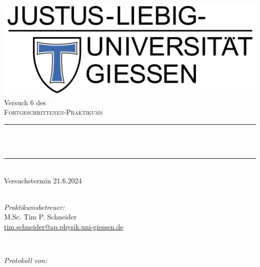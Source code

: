 \documentclass[12pt,a4paper,ngerman]{report}
\title{\versuchstitel}
\author{Frederik Uhlemann, Florian Adamczyk}
\date{\today}
\makeatletter
\let\thetitle\@title
\makeatother
\begin{document}
		
	
	\begin{titlepage}
		\centering
		\vspace*{0.5 cm}
		\includegraphics[width = 0.6 \textwidth]{JLU_Giessen-Logo}	%
		\\[2.0 cm]
		Versuch 6 des\\
		\textsc{\Large Fortgeschrittenen-Praktikums}\\ [0.3 cm]				%
		\rule{\linewidth}{0.2 mm} \\[0.4 cm]
		{ \huge \bfseries \thetitle}\\%
		\rule{\linewidth}{0.2 mm}\\
		Versuchstermin 21.6.2024 \\
		~ \\
		[2.0 cm]
		
		
		\begin{minipage}{0.49\textwidth}
			\begin{flushleft}
				 \emph{Praktikumsbetreuer:}\\
				 M.Sc. Tim P. Schneider\\
				 \small{\href{mailto:tim.schneider@ap.physik.uni-giessen.de}{tim.schneider@ap.physik.uni-giessen.de}}
			\end{flushleft}
		\end{minipage}~
		\begin{minipage}{0.49\textwidth}
			\begin{flushright}
				\emph{Protokoll von:} \\
				

\end{flushright}
\end{minipage}
\end{titlepage}
\end{document}
